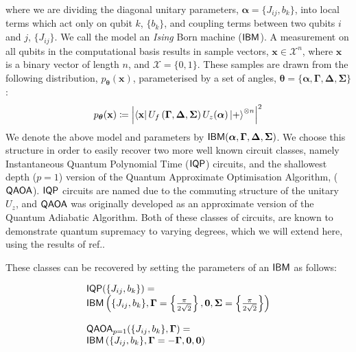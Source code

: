 \noindent where we are dividing the diagonal unitary parameters,  $\boldsymbol{\alpha} = \{J_{ij}, b_k\}$,  into local terms which act only on qubit $k$, $\{b_k\}$, and coupling terms between two qubits $i$ and $j$, $\{J_{ij}\}$. We call the model an \textit{Ising} Born machine ($\textsf{IBM}$).
A measurement on all qubits in the computational basis results in sample vectors, $\mathbf{x} \in \mathcal{X}^n$, where $\mathbf{x}$ is a binary vector of length $n$, and $\mathcal{X} = \{0, 1\}$. These samples are drawn from the following distribution, $p_{\boldsymbol\theta}(\mathbf{x})$, parameterised by a set of angles, $\boldsymbol\theta = \{\boldsymbol\alpha, \mathbf{\Gamma}, \mathbf{\Delta}, \mathbf{\Sigma}\}$:
\begin{align}
    p_{\boldsymbol\theta}(\mathbf{x}) \coloneqq \left|\bra{\mathbf{x}}U_f \left( \mathbf{\Gamma}, \mathbf{\Delta}, \mathbf{\Sigma} \right) U_z(\boldsymbol\alpha)\ket{+}^{\otimes n}\right|^2
\end{align}
We denote the above model and parameters by $\textsf{IBM}(\boldsymbol\alpha, \mathbf{\Gamma}, \mathbf{\Delta}, \mathbf{\Sigma})$. We choose this structure in order to easily recover two more well known circuit classes, namely Instantaneous Quantum Polynomial Time\cite{shepherd_temporally_2009} ($\operatorname{\textsf{IQP}}$) circuits, and the shallowest depth ($p=1$) version of the Quantum Approximate Optimisation Algorithm\cite{farhi_quantum_2014}, ($\operatorname{\textsf{QAOA}}$). $\operatorname{\textsf{IQP}}$ circuits are named due to the commuting structure of the unitary $U_z$,  and $\operatorname{\textsf{QAOA}}$\cite{farhi_quantum_2014} was originally developed as an approximate version of the Quantum Adiabatic Algorithm\cite{farhi_quantum_2000}. Both of these classes of circuits, are known to demonstrate quantum supremacy to varying degrees\cite{bremner_classical_2011, bremner_average-case_2016, farhi_quantum_2016, bremner_achieving_2017}, which we will extend here, using the results of ref.\cite{fujii_commuting_2017}.

These classes can be recovered by setting the parameters of an $\textsf{IBM}$ as follows:

\[
\begin{array}{lll}
\operatorname{\textsf{IQP}}(\{J_{ij}, b_{k}\}) =\\
\textsf{IBM}\left(\{J_{ij}, b_{k}\}, \mathbf{\Gamma} = \left\{\frac{\pi}{2\sqrt{2}}\right\}, \mathbf{0}, \mathbf{\Sigma}=  \left\{\frac{\pi}{2\sqrt{2}}\right\}\right) 
\\{}\\
\operatorname{\textsf{QAOA}}_{p=1}(\{J_{ij}, b_{k}\}, \mathbf{\Gamma}) =
\\
\textsf{IBM}\left(\{J_{ij}, b_{k}\}, \mathbf{\Gamma} = -\mathbf{\Gamma}, \mathbf{0} , \mathbf{0}\right)
\end{array}
\]

